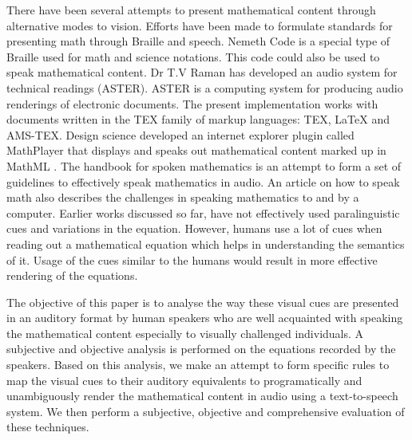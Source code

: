 \documentclass{article}
\begin{document}


There have been several attempts to present mathematical content through alternative modes to vision. Efforts have been made to formulate standards for presenting math through Braille and speech. Nemeth Code\cite{nemeth1973nemeth} is a special type of Braille used for math and science notations.  This code could also be used to speak mathematical content.
Dr T.V Raman has developed an audio system for technical readings (ASTER)\cite{raman1998audio}. ASTER is a computing system for producing audio renderings of electronic documents. The present implementation works with documents written in the TEX family of markup languages: TEX, LaTeX and AMS-TEX. Design science developed an internet explorer plugin called MathPlayer \cite{soiffer2005mathplayer} that displays and speaks out mathematical content marked up in MathML \cite{ion1998mathematical}. The handbook for spoken mathematics \cite{chang1983handbook} is an attempt to form a set of guidelines to effectively speak mathematics in audio. An article on how to speak math \cite{fateman1998can} also describes the challenges in speaking mathematics to and by a computer. Earlier works discussed so far, have not effectively  used paralinguistic cues and variations in the equation. However, humans use a lot of cues when reading out a mathematical equation which helps in understanding the semantics of it. Usage of the cues similar to the humans would result in more effective rendering of the equations.   

The objective of this paper is to analyse the way these visual cues are presented in an auditory format by human speakers who are well acquainted with speaking the mathematical content especially to visually challenged individuals. A subjective and objective analysis is performed on the equations recorded by the speakers. Based on this analysis, we make an attempt to form specific rules to map the visual cues to their auditory equivalents to programatically and unambiguously render the mathematical content in audio using a text-to-speech system. We then perform a subjective, objective and comprehensive evaluation of these techniques. 
\end{document}
